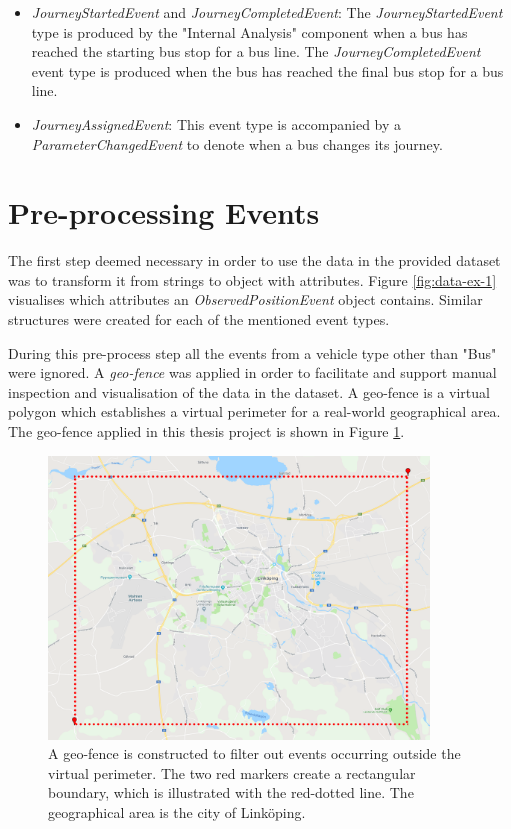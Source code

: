 \begin{itemize}
    \item \textit{JourneyStartedEvent} and \textit{JourneyCompletedEvent}:
    The \textit{JourneyStartedEvent} type is produced by the "Internal Analysis" component when a bus has reached the starting bus stop for a bus line.
    The \textit{JourneyCompletedEvent} event type is produced when the bus has reached the final bus stop for a bus line.

    \item \textit{JourneyAssignedEvent}:
    This event type is accompanied by a \textit{ParameterChangedEvent} to denote when a bus changes its journey.
\end{itemize}

\section{Pre-processing Events}
The first step deemed necessary in order to use the data in the provided dataset was to transform it from strings to object with attributes.
Figure \ref{fig:data-ex-1} visualises which attributes an \textit{ObservedPositionEvent} object contains.
Similar structures were created for each of the mentioned event types.

During this pre-process step all the events from a vehicle type other than "Bus" were ignored.
A \textit{geo-fence} was applied in order to facilitate and support manual inspection and visualisation of the data in the dataset.
A geo-fence is a virtual polygon which establishes a virtual perimeter for a real-world geographical area.
The geo-fence applied in this thesis project is shown in Figure \ref{fig:geo-fence}.

\begin{figure}[ht!]
    \centering
    \includegraphics[width=0.9\textwidth]{figures/geofencing_linkoping}
    \caption{A geo-fence is constructed to filter out events occurring outside the virtual perimeter.
    The two red markers create a rectangular boundary, which is illustrated with the red-dotted line.
    The geographical area is the city of Linköping.}
    \label{fig:geo-fence}
\end{figure}

